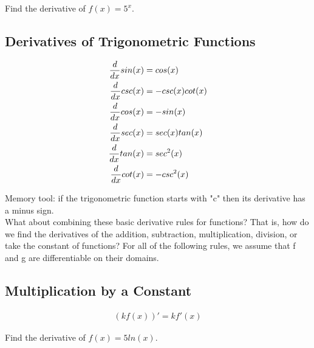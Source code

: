 \begin{exercise}\nonumber
    Find the derivative of $ f(x) = 5^x $.

    \vspace{1cm}
\end{exercise}

\subsection{Derivatives of Trigonometric Functions}

\begin{theorem}
    \begin{align}
        {d \over dx}sin(x) & = cos(x)        \\
        {d \over dx}csc(x) & = -csc(x)cot(x) \\
        {d \over dx}cos(x) & = -sin(x)       \\
        {d \over dx}sec(x) & = sec(x)tan(x)  \\
        {d \over dx}tan(x) & = sec^2(x)      \\
        {d \over dx}cot(x) & = -csc^2(x)
    \end{align}
\end{theorem}

Memory tool: if the trigonometric function starts with "c" then its derivative has a minus sign. \\

What about combining these basic derivative rules for functions? That is, how do we find the derivatives of the addition, subtraction, multiplication, division, or take the constant of functions? For all of the following rules, we assume that f and g are differentiable on their domains. \\

\subsection{Multiplication by a Constant}

\begin{theorem}
    \begin{align}
        (kf(x))' = kf'(x)
    \end{align}
\end{theorem}

\begin{exercise}\nonumber
    Find the derivative of $ f(x) = 5ln(x) $.

    \vspace{1cm}
\end{exercise}

